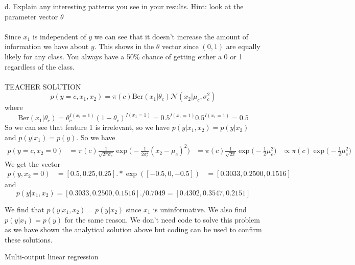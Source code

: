 \documentclass[draft]{exam} %
\theoremstyle{definition} \newtheorem*{defn}{Definition}
\begin{document}
\begin{questions}
\begin{solution}
d. Explain any interesting patterns you see in your results.  Hint: look at the parameter vector $\theta$ \\\\
Since $x_1$ is independent of $y$ we can see that it doesn't increase the amount of information we have about $y$.  This shows in the $\theta$ vector since $(0,1)$ are equally likely for any class.  You always have a 50\% chance of getting either a 0 or 1 regardless of the class.
\\\\
TEACHER SOLUTION
\[ p (y = c, x_1, x_2) = \pi(c) \text{Ber}(x_1|\theta_c)\mathcal{N}(x_2|
\mu_c, \sigma^2_c) \]
where 
\[ \text{Ber}(x_1|\theta_c) = \theta_c^{I(x_1=1)} (1-\theta_c)^{I(x_1=1)} =
0.5^{I(x_1=1)} 0.5^{I(x_1=1)} = 0.5 \]
So we can see that feature 1 is irrelevant, so we have $p(y|x_1, x_2) =
p(y|x_2)$ and $p(y|x_1) = p(y)$. So we have
\begin{align}
p(y=c, x_2=0) & = \pi(c) \frac{1}{\sqrt{2\pi\sigma_c}} \exp \big(-
\frac{1}{2\sigma^2_c} (x_2 - \mu_c)^2 \big)
& = \pi(c) \frac{1}{\sqrt{2\pi}} \exp \big(- \frac{1}{2} \mu_c^2 \big)
& \propto \pi(c) \exp \big(- \frac{1}{2} \mu_c^2 \big)
\end{align}
We get the vector
\begin{align}
p(y, x_2=0) & = [0.5, 0.25, 0.25] .* \exp([-0.5, 0, -0.5])
 & = [0.3033, 0.2500, 0.1516]
\end{align}
and
\[ p(y| x_1, x_2) = [0.3033, 0.2500, 0.1516] ./ 0.7049 =[0.4302, 0.3547,
0.2151] \]

We find that $p(y|x_1, x_2) = p(y|x_2)$ since $x_1$ is uninformative. We
also find $p(y|x_1) = p(y)$ for the same reason.
We don't need code to solve this problem as we have shown the analytical
solution above but coding can be used to confirm these solutions.
\end{solution}


 Multi-output linear regression \\


\end{questions}
\end{document}
